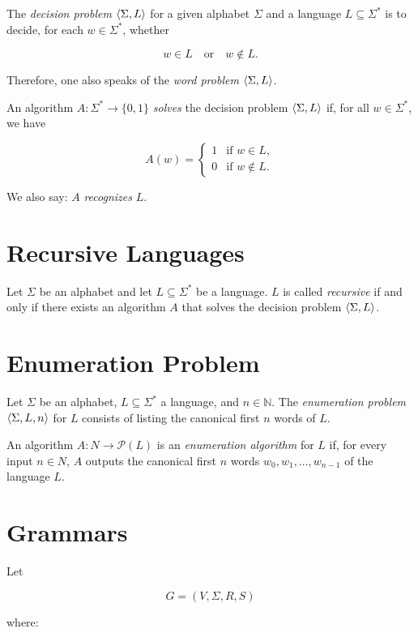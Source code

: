 The \emph{decision problem} \(\left\langle\Sigma, L\right\rangle\) for a given alphabet \(\Sigma\) and a language \(L \subseteq \Sigma^{*}\) is to decide, for each \(w \in \Sigma^{*}\), whether  

\[
    w \in L 
    \quad \text{or} \quad 
    w \notin L .
\]

Therefore, one also speaks of the \emph{word problem} \(\left\langle\Sigma, L\right\rangle\).  

An algorithm \(A \colon \Sigma^{*} \to \{0, 1\}\) \emph{solves} the decision problem \(\left\langle\Sigma, L\right\rangle\) if, for all \(w \in \Sigma^{*}\), we have

\[
    A(w) =
    \begin{cases}
    1 & \text{if } w \in L , \\
    0 & \text{if } w \notin L .
    \end{cases}
\]

We also say: \(A\) \emph{recognizes} \(L\).  

\section{Recursive Languages}

Let \(\Sigma\) be an alphabet and let \(L \subseteq \Sigma^{*}\) be a language.  
\(L\) is called \emph{recursive} if and only if there exists an algorithm \(A\) that solves the decision problem \(\left\langle\Sigma, L\right\rangle\).  

\section{Enumeration Problem}

Let \(\Sigma\) be an alphabet, \(L \subseteq \Sigma^{*}\) a language, and \(n \in \mathbb{N}\).  
The \emph{enumeration problem} \(\left\langle\Sigma, L, n\right\rangle\) for \(L\) consists of listing the canonical first \(n\) words of \(L\).  

An algorithm \(A \colon N \to \mathcal{P}(L)\) is an \emph{enumeration algorithm} for \(L\) if, for every input \(n \in N\), \(A\) outputs 
the canonical first \(n\) words \(w_{0}, w_{1}, \dots, w_{n-1}\) of the language \(L\).  

\section{Grammars}

Let 

\[
    G = (V, \Sigma, R, S)
\]

where:

